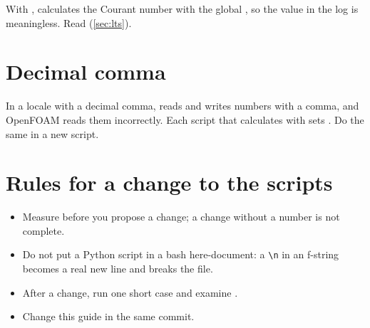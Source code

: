 With ,  calculates the Courant number with the
global , so the value in the log is meaningless. Read
 (\cref{sec:lts}).

\section{Decimal comma}\label{sec:ts-locale}

In a locale with a decimal comma,  reads and writes numbers with a comma, and
OpenFOAM reads them incorrectly. Each script that calculates with  sets
. Do the same in a new script.

\section{Rules for a change to the scripts}

\begin{itemize}
\item Measure before you propose a change; a change without a number is not complete.
\item Do not put a Python script in a bash here-document: a \texttt{\textbackslash n}
  in an f-string becomes a real new line and breaks the file.
\item After a change, run one short case and examine .
\item Change this guide in the same commit.
\end{itemize}
